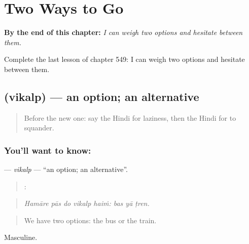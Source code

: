 
\chapter{Two Ways to Go}
\label{ch:hi-two-ways-to-go}

\begin{chapteropening}
\textbf{By the end of this chapter:} \emph{I can weigh two options and hesitate between them.}

Complete the last lesson of chapter 549: I can weigh two options and hesitate between them.
\end{chapteropening}

\section[\texorpdfstring{\hi{विकल्प} (vikalp)}{विकल्प (vikalp)}]{ (vikalp) — an option; an alternative}

\label{lesson:HI-C549-vikalp}



\begin{quote}
Before the new one: say the Hindi for laziness, then the Hindi for to squander.
\end{quote}

\subsection*{You'll want to know: }
\textbf{} — \emph{vikalp} — \textquotedblleft{}an option; an alternative\textquotedblright{}.

\begin{quote}
    :   
\end{quote}

\begin{quote}
\emph{Hamāre pās do vikalp haiṁ: bas yā ṭren.}
\end{quote}

\begin{quote}
We have two options: the bus or the train.
\end{quote}

Masculine.

